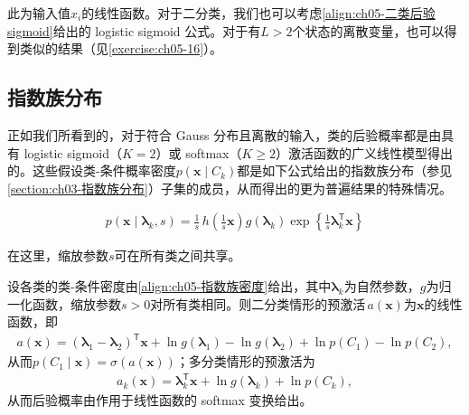 \documentclass[../../main.tex]{subfiles}
\begin{document}
此为输入值$x_i$的线性函数。对于二分类，我们也可以考虑\eqref{align:ch05-二类后验sigmoid}给出的 logistic sigmoid 公式。对于有$L>2$个状态的离散变量，也可以得到类似的结果（见\cref{exercise:ch05-16}）。

\subsection{指数族分布}\label{subsection:ch05-指数族分布}

正如我们所看到的，对于符合 Gauss 分布且离散的输入，类的后验概率都是由具有 logistic sigmoid（$K=2$）或 softmax（$K\geqslant 2$）激活函数的广义线性模型得出的。这些假设类-条件概率密度$p(\boldsymbol{x}\mid C_k)$都是如下公式给出的指数族分布（参见\cref{section:ch03-指数族分布}）子集的成员，从而得出的更为普遍结果的特殊情况。

\begin{align}
  p(\boldsymbol{x}\mid\boldsymbol{\lambda}_k,s)=\frac{1}{s}\,h\left(\frac{1}{s}\boldsymbol{x}\right)g(\boldsymbol{\lambda}_k)\exp\left\{\frac{1}{s}\boldsymbol{\lambda}_k^{\mathsf{T}}\boldsymbol{x}\right\}
  \label{align:ch05-指数族密度}
\end{align}

在这里，缩放参数$s$可在所有类之间共享。

\begin{proposition}\label{proposition:ch05-指数族后验}
设各类的类-条件密度由\eqref{align:ch05-指数族密度}给出，其中$\boldsymbol{\lambda}_k$为自然参数，$g$为归一化函数，缩放参数$s>0$对所有类相同。则二分类情形的预激活$\,a(\boldsymbol{x})$为$\boldsymbol{x}$的线性函数，即
\begin{align}
  a(\boldsymbol{x})=(\boldsymbol{\lambda}_1-\boldsymbol{\lambda}_2)^{\mathsf{T}}\boldsymbol{x}+\ln g(\boldsymbol{\lambda}_1)-\ln g(\boldsymbol{\lambda}_2)+\ln p(C_1)-\ln p(C_2),
  \label{align:ch05-指数族二类}
\end{align}
从而$p(C_1\mid\boldsymbol{x})=\sigma(a(\boldsymbol{x}))$；多分类情形的预激活为
\begin{align}
  a_k(\boldsymbol{x})=\boldsymbol{\lambda}_k^{\mathsf{T}}\boldsymbol{x}+\ln g(\boldsymbol{\lambda}_k)+\ln p(C_k),
  \label{align:ch05-指数族多类}
\end{align}
从而后验概率由作用于线性函数的 softmax 变换给出。
\end{proposition}
\end{document}
